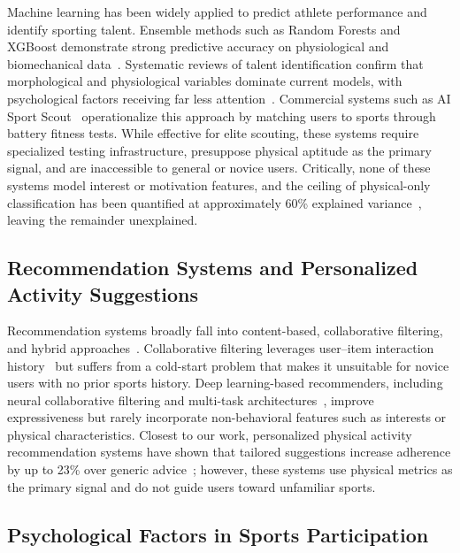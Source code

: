 \documentclass[conference]{IEEEtran}
\begin{document}
Machine learning has been widely applied to predict athlete performance and
identify sporting talent.
Ensemble methods such as Random Forests and XGBoost demonstrate strong
predictive accuracy on physiological and biomechanical
data~\cite{nature2025sports, bunker2019framework}.
Systematic reviews of talent identification confirm that morphological and
physiological variables dominate current models, with psychological factors
receiving far less attention~\cite{ramos2022talent}.
Commercial systems such as AI Sport Scout~\cite{aisportscout2024}
operationalize this approach by matching users to sports through battery
fitness tests.
While effective for elite scouting, these systems require specialized testing
infrastructure, presuppose physical aptitude as the primary signal, and are
inaccessible to general or novice users.
Critically, none of these systems model interest or motivation features, and the ceiling of
physical-only classification has been quantified at approximately 60\%
explained variance~\cite{lidor2005talent}, leaving the remainder unexplained.

\subsection{Recommendation Systems and Personalized Activity Suggestions}

Recommendation systems broadly fall into content-based, collaborative
filtering, and hybrid approaches~\cite{burke2002hybrid}.
Collaborative filtering leverages user--item interaction history~\cite{scitepress2017sports}
but suffers from a cold-start problem that makes it unsuitable for novice
users with no prior sports history.
Deep learning-based recommenders, including neural collaborative filtering
and multi-task architectures~\cite{zhang2019deep}, improve expressiveness
but rarely incorporate non-behavioral features such as interests or physical
characteristics.
Closest to our work, personalized physical activity recommendation systems
have shown that tailored suggestions increase adherence by up to 23\% over
generic advice~\cite{opast2023personalized}; however, these systems use
physical metrics as the primary signal and do not guide users toward
unfamiliar sports.

\subsection{Psychological Factors in Sports Participation}
\end{document}
